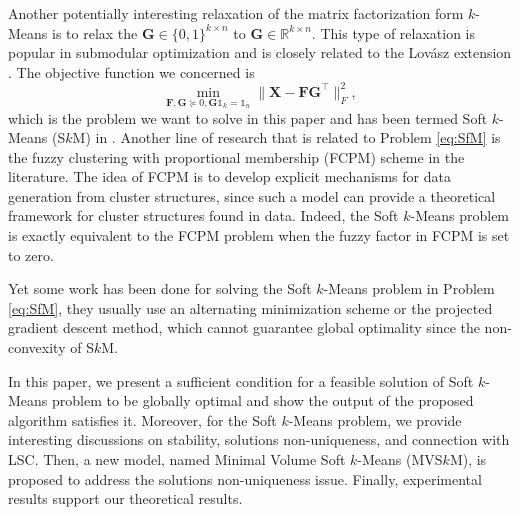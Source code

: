 \documentclass[journal]{IEEEtran}
\begin{document}
Another potentially interesting relaxation of the matrix factorization form $k$-Means is to relax the $\mathbf{G}\in\{0,1\}^{k\times n}$
to $\mathbf{G}\in\mathbb{R}^{k\times n}$. This type of relaxation is popular in submodular optimization and is closely related to the Lov\'{a}sz extension \cite{bach2013learning}. The objective function we concerned is
\begin{equation}\label{eq:SfM}
\min_{\mathbf{F},\mathbf{G}\succeq 0,\mathbf{G}\mathbb{1}_k = \mathbb{1}_n} \| \mathbf{X} - \mathbf{FG}^\top\|_F^2,
\end{equation}
which is the problem we want to solve in this paper and has been termed Soft $k$-Means (S$k$M) in \cite{arora2013similarity}.
Another line of research that is related to Problem \eqref{eq:SfM} is the fuzzy clustering with proportional membership (FCPM) scheme \cite{nascimento2003modeling} in the literature.
The idea of FCPM is to develop explicit mechanisms for data generation from cluster structures, since such a model can provide a theoretical framework for cluster structures found in data. Indeed, the Soft $k$-Means problem is exactly equivalent to the FCPM problem when the fuzzy factor in FCPM is set to zero.

Yet some work \cite{nascimento2000fuzzy,nascimento2003modeling,nascimento2016applying} has been done for solving the Soft $k$-Means problem in Problem \eqref{eq:SfM},
they usually use an alternating minimization scheme or the projected gradient descent method, 
which cannot guarantee global optimality since the non-convexity of S$k$M.

In this paper, we present a sufficient condition for a feasible solution of Soft $k$-Means problem to be globally optimal
and show the output of the proposed algorithm satisfies it.
Moreover, for the Soft $k$-Means problem, we provide interesting discussions on 
stability, solutions non-uniqueness, and connection with LSC.
Then, a new model, named Minimal Volume Soft $k$-Means (MVS$k$M), is proposed to address the solutions non-uniqueness issue.
Finally, experimental results support our theoretical results.
\end{document}
